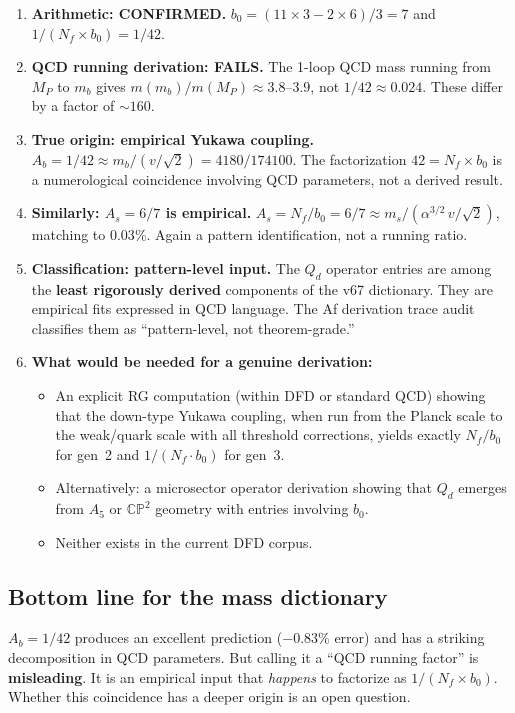 \documentclass[11pt,a4paper]{article}
\newcommand{\CP}{\mathbb{CP}}
\newcommand{\Nf}{N_f}
\theoremstyle{definition}
\theoremstyle{remark}
\begin{document}
\begin{enumerate}

\item \textcolor{pass}{\textbf{Arithmetic: CONFIRMED.}}
$b_0 = (11 \times 3 - 2 \times 6)/3 = 7$ and $1/(\Nf \times b_0) = 1/42$.

\item \textcolor{fail}{\textbf{QCD running derivation: FAILS.}}
The 1-loop QCD mass running from $M_P$ to $m_b$ gives $m(m_b)/m(M_P) \approx 3.8$--$3.9$,
not $1/42 \approx 0.024$.  These differ by a factor of $\sim 160$.

\item \textcolor{warn}{\textbf{True origin: empirical Yukawa coupling.}}
$A_b = 1/42 \approx m_b/(v/\sqrt{2}) = 4180/174100$.  The factorization
$42 = \Nf \times b_0$ is a numerological coincidence involving QCD
parameters, not a derived result.

\item \textcolor{warn}{\textbf{Similarly: $A_s = 6/7$ is empirical.}}
$A_s = \Nf/b_0 = 6/7 \approx m_s/(\alpha^{3/2}\,v/\sqrt{2})$, matching to
$0.03\%$.  Again a pattern identification, not a running ratio.

\item \textcolor{warn}{\textbf{Classification: pattern-level input.}}
The $Q_d$ operator entries are among the \textbf{least rigorously derived}
components of the v67 dictionary.  They are empirical fits expressed in QCD
language.  The Af derivation trace audit classifies them as ``pattern-level,
not theorem-grade.''

\item \textbf{What would be needed for a genuine derivation:}
\begin{itemize}
\item An explicit RG computation (within DFD or standard QCD) showing that
  the down-type Yukawa coupling, when run from the Planck scale to the
  weak/quark scale with all threshold corrections, yields exactly $\Nf/b_0$
  for gen~2 and $1/(\Nf \cdot b_0)$ for gen~3.
\item Alternatively: a microsector operator derivation showing that $Q_d$
  emerges from $A_5$ or $\CP^2$ geometry with entries involving $b_0$.
\item Neither exists in the current DFD corpus.
\end{itemize}

\end{enumerate}

\subsection*{Bottom line for the mass dictionary}

$A_b = 1/42$ produces an excellent prediction ($-0.83\%$ error) and has a
striking decomposition in QCD parameters.  But calling it a ``QCD running
factor'' is \textbf{misleading}.  It is an empirical input that \emph{happens}
to factorize as $1/(\Nf \times b_0)$.  Whether this coincidence has a deeper
origin is an open question.
\end{document}
